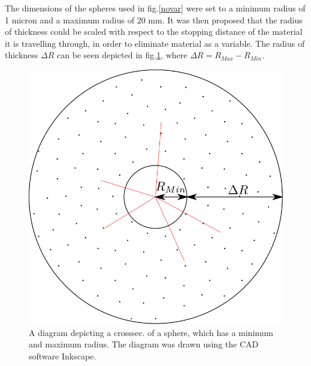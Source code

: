 \documentclass[12pt,a4paper]{article}
\begin{document}
\noindent The dimensions of the spheres used in fig.\ref{novar} were set to a minimum radius of 1 micron and a maximum radius of 20 mm. It was then proposed that the radius of thickness could be scaled with respect to the stopping distance of the material it is travelling through, in order to eliminate material as a variable. The radius of thickness $\Delta R$ can be seen depicted in fig.\ref{deltar}, where $\Delta R = R_{Max} - R_{Min}$.

\begin{figure}[h!]
\centering
\includegraphics[scale=0.2]{Images//Materials//RMAX.png}
\caption[width=\columnwidth]{A diagram depicting a crosssec. of a sphere, which has a minimum and maximum radius. The diagram was drawn using the CAD software Inkscape.}
\label{deltar}
\end{figure}

\newpage
\end{document}
